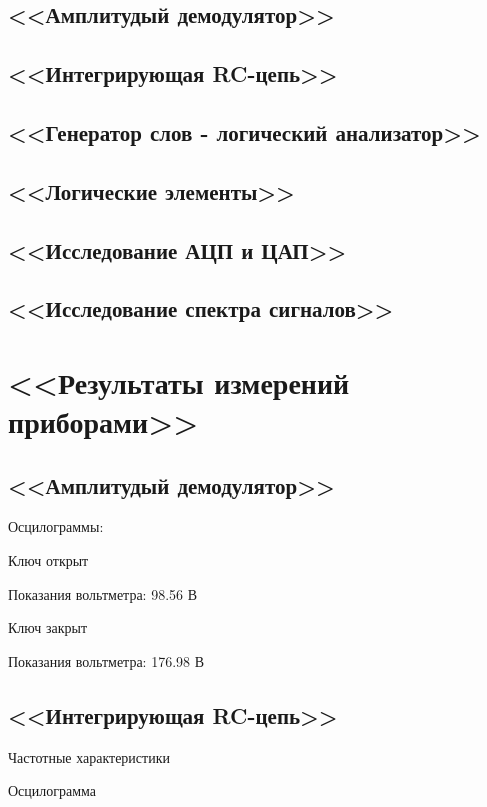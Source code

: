 \documentclass[11pt]{article}
\begin{document}
\subsection{<<Амплитудый демодулятор>>}

\subsection{<<Интегрирующая RC-цепь>>}

\subsection{<<Генератор слов - логический анализатор>>}

\subsection{<<Логические элементы>>}

\subsection{<<Исследование АЦП и ЦАП>>}

\subsection{<<Исследование спектра сигналов>>}

\section{<<Результаты измерений приборами>>}
\subsection{<<Амплитудый демодулятор>>}
Осцилограммы:
\begin{center}
    Ключ открыт

\end{center}
Показания вольтметра: 98.56 В
\begin{center}
    Ключ закрыт

\end{center}
Показания вольтметра: 176.98 В
\subsection{<<Интегрирующая RC-цепь>>}
\begin{center}
    Частотные характеристики

    Осцилограмма

\end{center}
\end{document}
